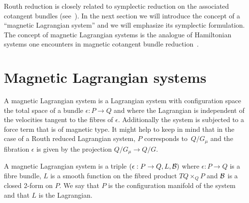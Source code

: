\documentclass[11pt]{article}
\newcommand{\B}{{\cal B}}
\newcommand{\e}{\epsilon}
\begin{document}
Routh reduction is closely related to symplectic reduction on the associated cotangent bundles (see~\cite{BC,marsdenrouth}). In the next section we will introduce the concept of a ``magnetic Lagrangian system'' and we will emphasize its symplectic formulation. The concept of magnetic Lagrangian systems is the analogue of Hamiltonian systems one encounters in magnetic cotangent bundle reduction~\cite{MarsdenHamRed}.

\section{Magnetic Lagrangian systems}\label{section3}

A magnetic Lagrangian system is a Lagrangian system with conf\/iguration space the total space of a bundle $\e:P\to Q$ and where the Lagrangian is independent of the velocities tangent to the f\/ibres of $\e$. Additionally the system is subjected to a force term that is of magnetic type. It might help to keep in mind that in the case of a Routh reduced Lagrangian system, $P$ corresponds to~$Q/G_\mu$ and the f\/ibration $\e$ is given by the projection $Q/G_\mu \to Q/G$.

\begin{definition} A magnetic Lagrangian system is a triple $(\e:P\to Q, L, \B)$ where $\e:P\to Q$ is a f\/ibre bundle, $L$ is a smooth function on the f\/ibred product $TQ\times_Q P$ and $\B$ is a closed 2-form on $P$. We say that $P$ is the conf\/iguration manifold of the system and that $L$ is the Lagrangian. \end{definition}
\end{document}
